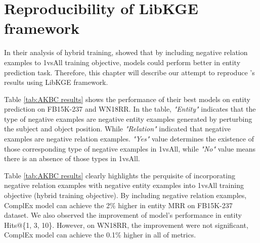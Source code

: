 
\chapter{Reproducibility of LibKGE framework}
\label{chap:reproducibility}

In their analysis of hybrid training, \citet{chen2021relation} showed that by including negative relation examples to 1vsAll training objective, models could perform better in entity prediction task. Therefore, this chapter will describe our  attempt to reproduce \citet{chen2021relation}'s results using LibKGE framework. 


Table \ref{tab:AKBC results} shows the performance of their best models on entity prediction on FB15K-237 and WN18RR. In the table, \textit{"Entity"} indicates that the type of negative examples are negative entity examples generated by perturbing the subject and object position. While \textit{"Relation"} indicated that negative examples are negative relation examples. \textit{"Yes"} value determines the existence of those corresponding type of negative examples in 1vsAll, while \textit{"No"} value means there is an absence of those types in 1vsAll.

Table \ref{tab:AKBC results} clearly highlights the perquisite of incorporating negative relation examples with negative entity examples into 1vsAll training objective (hybrid training objective). By including negative relation examples,  ComplEx model can achieve the 2\% higher in entity MRR on FB15K-237 dataset. We also observed the improvement of model's performance in entity Hits@\{1, 3, 10\}. However, on WN18RR, the improvement were not significant, ComplEx model can achieve the 0.1\% higher in all of metrics.


